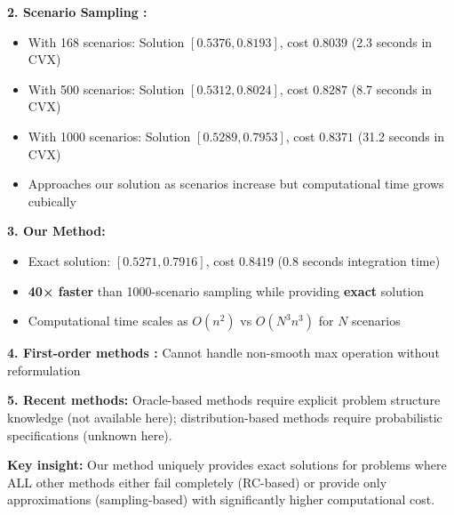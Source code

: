 \documentclass[journal,twoside,web]{ieeecolor}
\newcommand{\rev}[1]{\textcolor{revisionblue}{#1}}
\begin{document}
\rev{\textbf{2. Scenario Sampling \cite{calafiore2004}:}}
\begin{itemize}
\item \rev{With 168 scenarios: Solution $[0.5376, 0.8193]$, cost $0.8039$ (2.3 seconds in CVX)}
\item \rev{With 500 scenarios: Solution $[0.5312, 0.8024]$, cost $0.8287$ (8.7 seconds in CVX)}
\item \rev{With 1000 scenarios: Solution $[0.5289, 0.7953]$, cost $0.8371$ (31.2 seconds in CVX)}
\item \rev{Approaches our solution as scenarios increase but computational time grows cubically}
\end{itemize}

\rev{\textbf{3. Our Method:}}
\begin{itemize}
\item \rev{Exact solution: $[0.5271, 0.7916]$, cost $0.8419$ (0.8 seconds integration time)}
\item \rev{\textbf{40× faster} than 1000-scenario sampling while providing \textbf{exact} solution}
\item \rev{Computational time scales as $O(n^2)$ vs $O(N^3n^3)$ for $N$ scenarios}
\end{itemize}

\rev{\textbf{4. First-order methods \cite{he2022}:} Cannot handle non-smooth max operation without reformulation}

\rev{\textbf{5. Recent methods:} Oracle-based methods require explicit problem structure knowledge (not available here); distribution-based methods require probabilistic specifications (unknown here).}

\rev{\textbf{Key insight:} Our method uniquely provides exact solutions for problems where ALL other methods either fail completely (RC-based) or provide only approximations (sampling-based) with significantly higher computational cost.}
\end{document}
